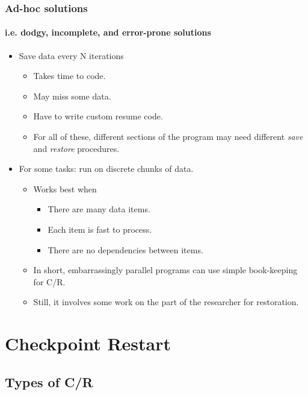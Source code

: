\documentclass[compress]{beamer}
\begin{document}

\begin{frame}
\frametitle{Ad-hoc solutions}
\framesubtitle{i.e. dodgy, incomplete, and error-prone solutions}

\begin{itemize}
\item{Save data every N iterations}
  \begin{itemize}
  \item{Takes time to code.}
  \item{May miss some data.}
  \item{Have to write custom resume code.}
  \item{For all of these, different sections of the program may need
    different \textit{save} and \textit{restore} procedures.}
  \end{itemize}  
  \item{For some tasks: run on discrete chunks of data.}
    \begin{itemize}
    \item{Works best when}
      \begin{itemize}
      \item{There are many data items.}
      \item{Each item is fast to process.}
      \item{There are no dependencies between items.}
      \end{itemize}
    \item{In short, embarrassingly parallel programs can use simple book-keeping for C/R}.
    \item{Still, it involves some work on the part of the researcher for restoration.}
  \end{itemize}
\end{itemize}

\end{frame}


\section{Checkpoint Restart}  %

\subsection{Types of C/R}     %
\end{document}
